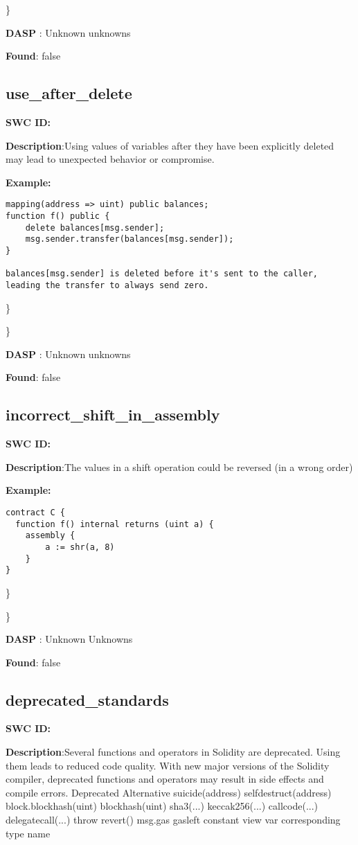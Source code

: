 \documentclass{article}
\begin{document}
\} 

\textbf{DASP} : Unknown unknowns

\textbf{Found}: false

\subsection{use\_after\_delete} 
\textbf{SWC \textunderscore ID:} 

\textbf{Description}:Using values of variables after they have been explicitly deleted may lead to unexpected behavior or compromise.


\textbf{Example:} 
\begin{verbatim}
mapping(address => uint) public balances;
function f() public {
    delete balances[msg.sender];
    msg.sender.transfer(balances[msg.sender]);
}

balances[msg.sender] is deleted before it's sent to the caller, leading the transfer to always send zero.

\end{verbatim}\} 

\} 

\textbf{DASP} : Unknown unknowns

\textbf{Found}: false

\subsection{incorrect\_shift\_in\_assembly} 
\textbf{SWC \textunderscore ID:} 

\textbf{Description}:The values in a shift operation could be reversed (in a wrong order)


\textbf{Example:} 
\begin{verbatim}
contract C {
  function f() internal returns (uint a) {
    assembly {
        a := shr(a, 8)
    }
}

\end{verbatim}\} 

\} 

\textbf{DASP} : Unknown Unknowns

\textbf{Found}: false

\subsection{deprecated\_standards} 
\textbf{SWC \textunderscore ID:} 

\textbf{Description}:Several functions and operators in Solidity are deprecated. Using them leads to reduced code quality. With new major versions of the Solidity compiler, deprecated functions and operators may result in side effects and compile errors.
  Deprecated              Alternative
  suicide(address)        selfdestruct(address)
  block.blockhash(uint)   blockhash(uint)
  sha3(...)               keccak256(...)
  callcode(...)           delegatecall(...)
  throw                   revert()
  msg.gas                 gasleft
  constant                view
  var                     corresponding type name
\end{document}
